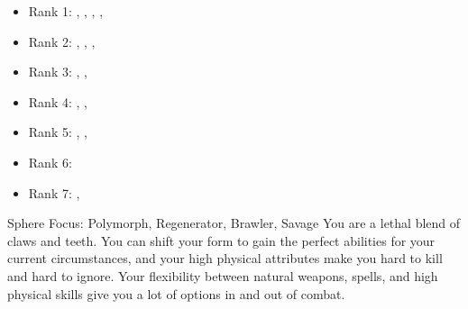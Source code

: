             \begin{itemize}
                \item Rank 1: , , , , 
                \item Rank 2: , , , 
                \item Rank 3: , , 
                \item Rank 4: , , 
                \item Rank 5: , , 
                \item Rank 6: 
                \item Rank 7: , 
            \end{itemize}
             Sphere Focus: Polymorph, Regenerator, Brawler, Savage
             You are a lethal blend of claws and teeth.
            You can shift your form to gain the perfect abilities for your current circumstances, and your high physical attributes make you hard to kill and hard to ignore.
            Your flexibility between natural weapons, spells, and high physical skills give you a lot of options in and out of combat.

